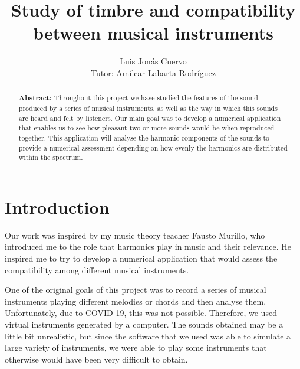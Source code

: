 \documentclass[twocolumn]{revtex4}
\begin{document}

\pagestyle{fancy}



\title{Study of timbre and compatibility between musical instruments}
\author{Luis Jonás Cuervo \\ Tutor: Amílcar Labarta Rodríguez}



\begin{abstract}
{\bf Abstract:} Throughout this project we have studied the features of the sound produced by a series of musical instruments, as well as the way in which this sounds are heard and felt by listeners. Our main goal was to develop a numerical application that enables us to see how pleasant two or more sounds would be when reproduced together. This application will analyse the harmonic components of the sounds to provide a numerical assessment depending on how evenly the harmonics are distributed within the spectrum.
\end{abstract}

\maketitle


\section{Introduction}

Our work was inspired by my music theory teacher Fausto Murillo, who introduced me to the role that harmonics play in music and their relevance. He inspired me to try to develop a numerical application that would assess the compatibility among different musical instruments.

One of the original goals of this project was to record a series of musical instruments playing different melodies or chords and then analyse them. Unfortunately, due to COVID-19, this was not possible. Therefore, we used virtual instruments generated by a computer. The sounds obtained may be a little bit unrealistic, but since the software that we used was able to simulate a large variety of instruments, we were able to play some instruments that otherwise would have been very difficult to obtain.
\end{document}
